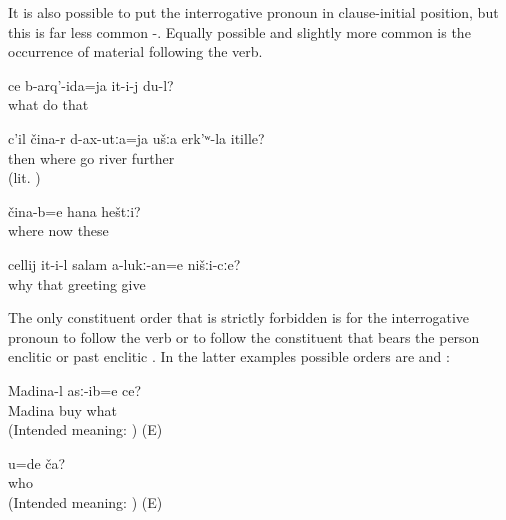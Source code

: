 It is also possible to put the interrogative pronoun in clause-initial position, but this is far less common -. Equally possible and slightly more common is the occurrence of material following the verb.
%
\begin{exe}
	\ex	\label{ex:‎[He does not leave me alone], what should I do with him}
	\gll	ce	b-arq'-ida=ja	it-i-j	du-l?\\
		what	do	that	\\
	\glt	{}

	\ex	\label{ex:‎‎‎Then from where do you cross the river}
	\gll	c'il	čina-r	d-ax-utːa=ja	ušːa	erk'ʷ-la itille?\\
		then	where	go		river	further\\
	\glt	{} (lit. )

	\ex	\label{ex:‎Where are these now? (these = people)}
	\gll	čina-b=e	hana	heštːi?\\
		where	now	these	\\
	\glt	{}

	\ex	\label{ex:Why will he not greet us}
	\gll	cellij	it-i-l	salam	a-lukː-an=e	nišːi-cːe?\\
		why	that	greeting	give		\\
	\glt	{}
\end{exe}

The only constituent order that is strictly forbidden is for the interrogative pronoun to follow the verb  or to follow the constituent that bears the person enclitic or past enclitic . In the latter examples possible orders are  and :
%
\begin{exe}
	\ex	\label{ex:What did Madina buy ungrammatical}
	\gll	* Madina-l	asː-ib=e ce?\\
		{} Madina	buy	what\\
	\glt	(Intended meaning: ) (E)

	\ex	\label{ex:Who are you ungrammatical}
	\gll	* u=de ča?\\
		{} 	who\\
	\glt	(Intended meaning: ) (E)
\end{exe}

